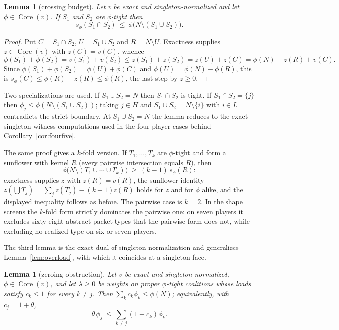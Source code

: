 \documentclass[11pt]{article}
\newtheorem{lemma}[theorem]{Lemma}
\newcommand{\core}{\operatorname{Core}}
\begin{document}
\begin{lemma}[crossing budget]\label{sel:lem:crossing}
Let $v$ be exact and singleton-normalized and let $\phi\in\core(v)$.  If $S_1$
and $S_2$ are $\phi$-tight then
\[
 s_\phi(S_1\cap S_2)\ \le\ \phi\bigl(N\setminus(S_1\cup S_2)\bigr).
\]
\end{lemma}

\begin{proof}
Put $C=S_1\cap S_2$, $U=S_1\cup S_2$ and $R=N\setminus U$.  Exactness supplies
$z\in\core(v)$ with $z(C)=v(C)$, whence
\[
 \phi(S_1)+\phi(S_2)=v(S_1)+v(S_2)\le z(S_1)+z(S_2)=z(U)+z(C)
   =\phi(N)-z(R)+v(C).
\]
Since $\phi(S_1)+\phi(S_2)=\phi(U)+\phi(C)$ and $\phi(U)=\phi(N)-\phi(R)$, this
is $s_\phi(C)\le\phi(R)-z(R)\le\phi(R)$, the last step by $z\ge0$.
\end{proof}

Two specializations are used.  If $S_1\cup S_2=N$ then $S_1\cap S_2$ is tight.
If $S_1\cap S_2=\{j\}$ then $\phi_j\le\phi(N\setminus(S_1\cup S_2))$; taking
$j\in H$ and $S_1\cup S_2=N\setminus\{i\}$ with $i\in L$ contradicts the strict
boundary.  At $S_1\cup S_2=N$ the lemma reduces to the exact singleton-witness
computations used in the four-player cases behind
Corollary~\ref{cor:fourfive}.

The same proof gives a $k$-fold version.  If $T_1,\ldots,T_k$ are
$\phi$-tight and form a sunflower with kernel $R$ (every pairwise
intersection equals $R$), then
\[
 \phi\bigl(N\setminus(T_1\cup\cdots\cup T_k)\bigr)\ \ge\ (k-1)\,s_\phi(R):
\]
exactness supplies $z$ with $z(R)=v(R)$, the sunflower identity
$z(\bigcup T_j)=\sum_jz(T_j)-(k-1)z(R)$ holds for $z$ and for $\phi$ alike,
and the displayed inequality follows as before.  The pairwise case is $k=2$.
In the shape screens the $k$-fold form strictly dominates the pairwise one:
on seven players it excludes sixty-eight abstract packet types that the
pairwise form does not, while excluding no realized type on six or seven
players.

The third lemma is the exact dual of singleton normalization and
generalizes Lemma~\ref{lem:overload}, with which it coincides at a
singleton face.

\begin{lemma}[zeroing obstruction]\label{sel:lem:zero}
Let $v$ be exact and singleton-normalized, $\phi\in\core(v)$, and let
$\lambda\ge0$ be weights on proper $\phi$-tight coalitions whose loads satisfy
$c_k\le1$ for every $k\ne j$.  Then $\sum_kc_k\phi_k\le\phi(N)$; equivalently,
with $c_j=1+\theta$,
\[
 \theta\,\phi_j\ \le\ \sum_{k\ne j}(1-c_k)\phi_k .
\]
\end{lemma}
\end{document}
